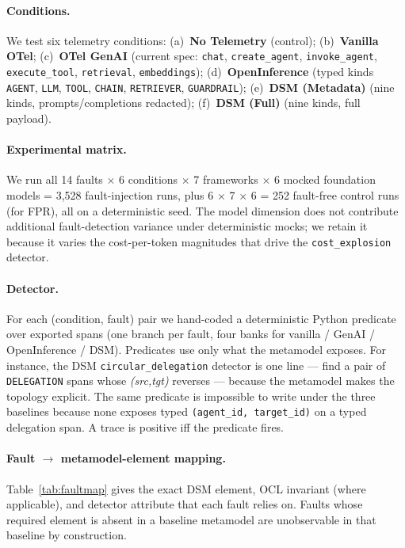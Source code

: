 \documentclass[sigconf,nonacm]{acmart}
\begin{document}
\paragraph{Conditions.} We test six telemetry conditions: (a)~\textbf{No Telemetry} (control); (b)~\textbf{Vanilla OTel}; (c)~\textbf{OTel GenAI} (current spec: \texttt{chat}, \texttt{create\_agent}, \texttt{invoke\_agent}, \texttt{execute\_tool}, \texttt{retrieval}, \texttt{embeddings}); (d)~\textbf{OpenInference} (typed kinds \texttt{AGENT}, \texttt{LLM}, \texttt{TOOL}, \texttt{CHAIN}, \texttt{RETRIEVER}, \texttt{GUARDRAIL}); (e)~\textbf{DSM (Metadata)} (nine kinds, prompts/completions redacted); (f)~\textbf{DSM (Full)} (nine kinds, full payload).

\paragraph{Experimental matrix.} We run all 14 faults $\times$ 6 conditions $\times$ 7 frameworks $\times$ 6 mocked foundation models = 3{,}528 fault-injection runs, plus 6 $\times$ 7 $\times$ 6 = 252 fault-free control runs (for FPR), all on a deterministic seed. The model dimension does not contribute additional fault-detection variance under deterministic mocks; we retain it because it varies the cost-per-token magnitudes that drive the \texttt{cost\_explosion} detector.

\paragraph{Detector.} For each (condition, fault) pair we hand-coded a deterministic Python predicate over exported spans (one branch per fault, four banks for vanilla / GenAI / OpenInference / DSM). Predicates use only what the metamodel exposes. For instance, the DSM \texttt{circular\_delegation} detector is one line --- find a pair of \texttt{DELEGATION} spans whose \emph{(src,tgt)} reverses --- because the metamodel makes the topology explicit. The same predicate is impossible to write under the three baselines because none exposes typed \texttt{(agent\_id, target\_id)} on a typed delegation span. A trace is positive iff the predicate fires.

\paragraph{Fault $\rightarrow$ metamodel-element mapping.}
Table~\ref{tab:faultmap} gives the exact DSM element, OCL invariant (where applicable), and detector attribute that each fault relies on. Faults whose required element is absent in a baseline metamodel are unobservable in that baseline by construction.
\end{document}
